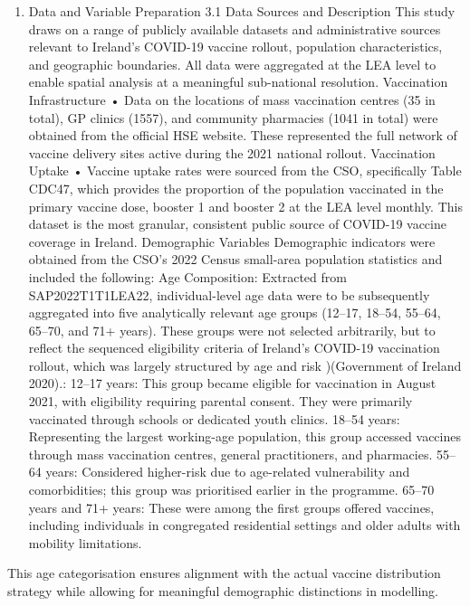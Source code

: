 \documentclass{article}
\providecommand{\tightlist}{%
  \setlength{\itemsep}{0pt}\setlength{\parskip}{0pt}}
\begin{document}
\begin{enumerate}
\def\labelenumi{\arabic{enumi}.}
\setcounter{enumi}{2}
\tightlist
\item
  Data and Variable Preparation 3.1 Data Sources and Description This
  study draws on a range of publicly available datasets and
  administrative sources relevant to Ireland's COVID-19 vaccine rollout,
  population characteristics, and geographic boundaries. All data were
  aggregated at the LEA level to enable spatial analysis at a meaningful
  sub-national resolution. Vaccination Infrastructure • Data on the
  locations of mass vaccination centres (35 in total), GP clinics
  (1557), and community pharmacies (1041 in total) were obtained from
  the official HSE website. These represented the full network of
  vaccine delivery sites active during the 2021 national rollout.
  Vaccination Uptake • Vaccine uptake rates were sourced from the CSO,
  specifically Table CDC47, which provides the proportion of the
  population vaccinated in the primary vaccine dose, booster 1 and
  booster 2 at the LEA level monthly. This dataset is the most granular,
  consistent public source of COVID-19 vaccine coverage in Ireland.
  Demographic Variables Demographic indicators were obtained from the
  CSO's 2022 Census small-area population statistics and included the
  following: Age Composition: Extracted from SAP2022T1T1LEA22,
  individual-level age data were to be subsequently aggregated into five
  analytically relevant age groups (12--17, 18--54, 55--64, 65--70, and
  71+ years). These groups were not selected arbitrarily, but to reflect
  the sequenced eligibility criteria of Ireland's COVID-19 vaccination
  rollout, which was largely structured by age and risk )(Government of
  Ireland 2020).: 12--17 years: This group became eligible for
  vaccination in August 2021, with eligibility requiring parental
  consent. They were primarily vaccinated through schools or dedicated
  youth clinics. 18--54 years: Representing the largest working-age
  population, this group accessed vaccines through mass vaccination
  centres, general practitioners, and pharmacies. 55--64 years:
  Considered higher-risk due to age-related vulnerability and
  comorbidities; this group was prioritised earlier in the programme.
  65--70 years and 71+ years: These were among the first groups offered
  vaccines, including individuals in congregated residential settings
  and older adults with mobility limitations.
\end{enumerate}

This age categorisation ensures alignment with the actual vaccine
distribution strategy while allowing for meaningful demographic
distinctions in modelling.
\end{document}
